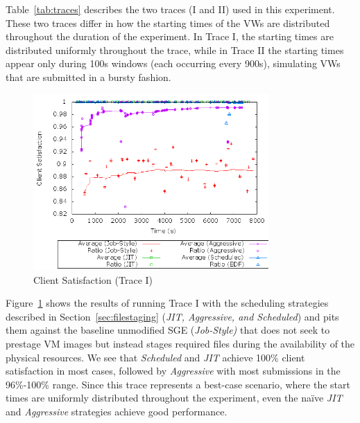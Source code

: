 \documentclass[singlespace]{ccw_chithesis}
\begin{document}
Table~\ref{tab:traces} describes the two traces (I and II) used in this experiment.
These two traces differ in how the starting times of the VWs are
distributed throughout the duration of the experiment. In Trace I, the
starting times are distributed uniformly throughout the trace, while in
Trace II the starting times appear only during 100s windows (each
occurring every 900s), simulating VWs that are submitted in a bursty
fashion.

\begin{figure}
  \begin{center}
    \includegraphics[width=0.8\textwidth]{figures/ClientSatisfaction-UniformStartTimes.png}
    \caption{Client Satisfaction (Trace I)}
	\label{fig:clientsatisfactionI}
  \end{center}
\end{figure}

Figure~\ref{fig:clientsatisfactionI} shows the results of running Trace I with the scheduling
strategies described in Section~\ref{sec:filestaging} (\emph{JIT, Aggressive, and
Scheduled}) and pits them against the baseline unmodified SGE
(\emph{Job{}-Style)} that does not seek to prestage VM images but
instead stages required files during the availability of the physical
resources. We see that \emph{Scheduled} and \emph{JIT} achieve 100\%
client satisfaction in most cases, followed by \emph{Aggressive }with
most submissions in the 96\%{}-100\% range. Since this trace represents
a best{}-case scenario, where the start times are uniformly distributed
throughout the experiment, even the na\"ive \emph{JIT} and
\emph{Aggressive} strategies achieve good performance.
\end{document}
